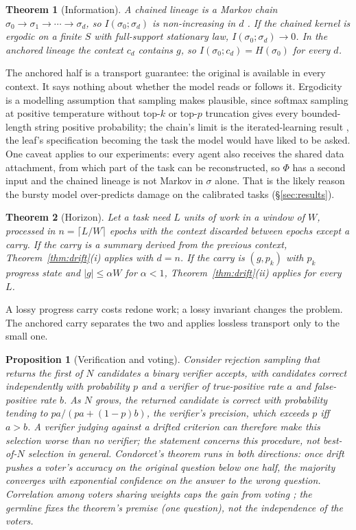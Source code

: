 \documentclass[11pt]{article}
\newtheorem{theorem}{Theorem}
\newtheorem{proposition}{Proposition}
\begin{document}
\begin{theorem}[Information]\label{thm:info}
A chained lineage is a Markov chain $\sigma_0\to\sigma_1\to\cdots\to\sigma_d$, so $I(\sigma_0;\sigma_d)$ is non-increasing in $d$ \citep{cover2006}. If the chained kernel is ergodic on a finite $S$ with full-support stationary law, $I(\sigma_0;\sigma_d)\to0$. In the anchored lineage the context $c_d$ contains $g$, so $I(\sigma_0;c_d)=H(\sigma_0)$ for every $d$.
\end{theorem}
The anchored half is a transport guarantee: the original is available in every context. It says nothing about whether the model reads or follows it. Ergodicity is a modelling assumption that sampling makes plausible, since softmax sampling at positive temperature without top-$k$ or top-$p$ truncation gives every bounded-length string positive probability; the chain's limit is the iterated-learning result \citep{griffiths2007}, the leaf's specification becoming the task the model would have liked to be asked. One caveat applies to our experiments: every agent also receives the shared data attachment, from which part of the task can be reconstructed, so $\Phi$ has a second input and the chained lineage is not Markov in $\sigma$ alone. That is the likely reason the bursty model over-predicts damage on the calibrated tasks (\S\ref{sec:results}).

\begin{theorem}[Horizon]\label{thm:horizon}
Let a task need $L$ units of work in a window of $W$, processed in $n=\lceil L/W\rceil$ epochs with the context discarded between epochs except a carry. If the carry is a summary derived from the previous context, Theorem~\ref{thm:drift}(i) applies with $d=n$. If the carry is $(g,p_k)$ with $p_k$ progress state and $|g|\le\alpha W$ for $\alpha<1$, Theorem~\ref{thm:drift}(ii) applies for every $L$.
\end{theorem}
A lossy progress carry costs redone work; a lossy invariant changes the problem. The anchored carry separates the two and applies lossless transport only to the small one.

\begin{proposition}[Verification and voting]
Consider rejection sampling that returns the first of $N$ candidates a binary verifier accepts, with candidates correct independently with probability $p$ and a verifier of true-positive rate $a$ and false-positive rate $b$. As $N$ grows, the returned candidate is correct with probability tending to $pa/(pa+(1-p)b)$, the verifier's precision, which exceeds $p$ iff $a>b$. A verifier judging against a drifted criterion can therefore make this selection worse than no verifier; the statement concerns this procedure, not best-of-$N$ selection in general. Condorcet's theorem \citep{condorcet1785} runs in both directions: once drift pushes a voter's accuracy on the \emph{original} question below one half, the majority converges with exponential confidence on the answer to the wrong question. Correlation among voters sharing weights caps the gain from voting \citep{boland1989}; the germline fixes the theorem's premise (one question), not the independence of the voters.
\end{proposition}
\end{document}
